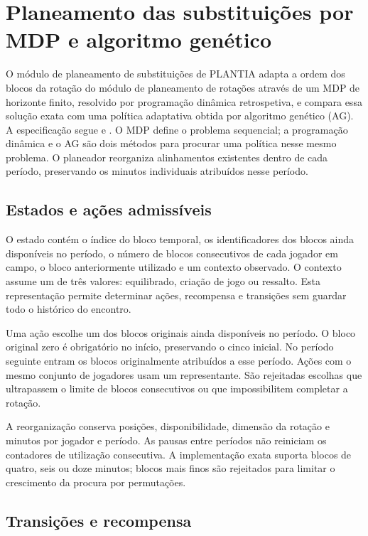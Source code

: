 \chapter{Planeamento das substituições por MDP e algoritmo genético}
\label{chap:substituicoes}

O módulo de planeamento de substituições de PLANTIA adapta a ordem dos blocos da rotação do módulo de planeamento de rotações
através de um MDP de horizonte finito, resolvido por programação dinâmica
retrospetiva, e compara essa solução exata com uma política adaptativa
obtida por algoritmo genético (AG). A especificação segue
 e
. O MDP define o problema sequencial;
a programação dinâmica e o AG são dois métodos para procurar uma política
nesse mesmo problema.
O planeador reorganiza alinhamentos existentes dentro de cada período,
preservando os minutos individuais atribuídos nesse período.

\section{Estados e ações admissíveis}

O estado contém o índice do bloco temporal, os identificadores dos blocos
ainda disponíveis no período, o número de blocos consecutivos de cada
jogador em campo, o bloco anteriormente utilizado e um contexto observado.
O contexto assume um de três valores: equilibrado, criação de jogo ou
ressalto. Esta representação permite determinar ações, recompensa e
transições sem guardar todo o histórico do encontro.

Uma ação escolhe um dos blocos originais ainda disponíveis no período.
O bloco original zero é obrigatório no início, preservando o cinco inicial.
No período seguinte entram os blocos originalmente atribuídos a esse
período. Ações com o mesmo conjunto de jogadores usam um representante.
São rejeitadas escolhas que ultrapassem o limite de blocos consecutivos
ou que impossibilitem completar a rotação.

A reorganização conserva posições, disponibilidade, dimensão da rotação
e minutos por jogador e período. As pausas entre períodos não reiniciam
os contadores de utilização consecutiva. A implementação exata suporta
blocos de quatro, seis ou doze minutos; blocos mais finos são rejeitados
para limitar o crescimento da procura por permutações.

\section{Transições e recompensa}

